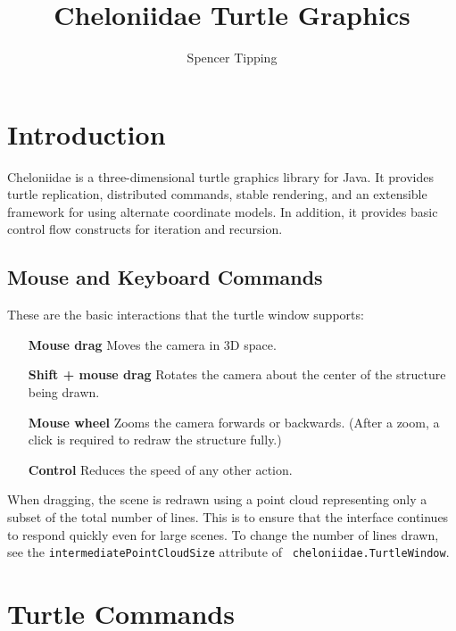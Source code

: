 \documentclass{article}
\begin{document}
  \title{Cheloniidae Turtle Graphics}
  \author{Spencer Tipping}
  \date{}
  \maketitle

  \tableofcontents

  \section{Introduction}
    \label{sec:introduction}

    Cheloniidae is a three-dimensional turtle graphics library for Java. It provides turtle replication, distributed commands, stable rendering, and an
    extensible framework for using alternate coordinate models. In addition, it provides basic control flow constructs for iteration and recursion.

    \subsection{Mouse and Keyboard Commands}
      \label{sec:mouse-and-keyboard-commands}

      These are the basic interactions that the turtle window supports:

      \begin{enumerate}
        \item[\bf Mouse drag]         Moves the camera in 3D space.
        \item[\bf Shift + mouse drag] Rotates the camera about the center of the structure being drawn.
        \item[\bf Mouse wheel]        Zooms the camera forwards or backwards. (After a zoom, a click is required to redraw the structure fully.)
        \item[\bf Control]            Reduces the speed of any other action.
      \end{enumerate}

      When dragging, the scene is redrawn using a point cloud representing only a subset of the total number of lines. This is to ensure that the interface
      continues to respond quickly even for large scenes. To change the number of lines drawn, see the {\tt intermediatePointCloudSize} attribute of {\tt
      cheloniidae.TurtleWindow}.

  \section{Turtle Commands}
    \label{sec:turtle-commands}
\end{document}
